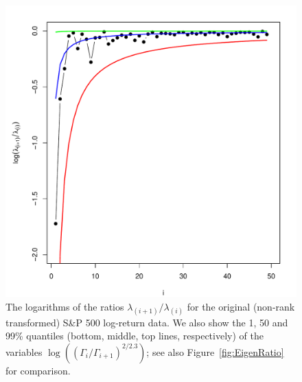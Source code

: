 \begin{figure}[htb!]
  \centering
    \includegraphics[scale=0.550]{EigenRatioSP500_log_50_shown.pdf}
  \caption{The logarithms of the ratios $\lambda_{(i+1)} / \lambda_{(i)}$ for the original (non-rank transformed) S\&P 500 log-return data.
We also show the 1, 50 and 99\% quantiles (bottom, middle, top lines, respectively) of the variables
$\log((\Gamma_i/ \Gamma_{i+1})^{2/2.3})$; see also Figure~\ref{fig:EigenRatio} for comparison.}\label{fig:22}
\end{figure}


